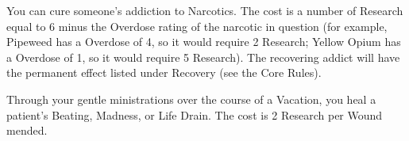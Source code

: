 {\cbreak




You can cure someone's addiction to Narcotics.  The cost is a number of Research equal to 6 minus the \MAX Overdose rating of the narcotic in question (for example, Pipeweed has a \MAX Overdose of 4, so it would require 2 Research; Yellow Opium has a \MAX Overdose of 1, so it would require 5 Research).  The recovering addict will have the permanent effect listed under Recovery (see the Core Rules).




Through your gentle ministrations over the course of a Vacation, you heal a patient's Beating, Madness, or Life Drain.  The cost is 2 Research per Wound mended.




}%
